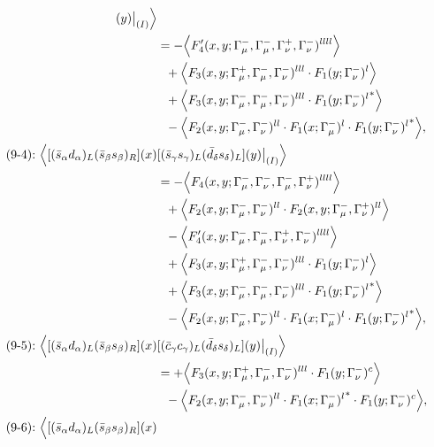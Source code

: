 \begin{align}
[(\bar d_\gamma d_\gamma)_L(\bar d_\delta s_\delta)_L](y)\big|_{(I)}
\Big\rangle
\notag\\*
&=
 - \Big\langle F_4'(x,y;\Gamma_\mu^-,\Gamma_\mu^-,\Gamma_\nu^+,\Gamma_\nu^-)^{llll}\Big\rangle
\notag\\*&\ \ 
 + \Big\langle F_3(x,y;\Gamma_\mu^+,\Gamma_\mu^-,\Gamma_\nu^-)^{lll} \cdot F_1(y;\Gamma_\nu^-)^l\Big\rangle
\notag\\*&\ \ 
 + \Big\langle F_3(x,y;\Gamma_\mu^-,\Gamma_\mu^-,\Gamma_\nu^-)^{lll} \cdot {F_1(y;\Gamma_\nu^-)^l}^*\Big\rangle
\notag\\*&\ \ 
 - \Big\langle F_2(x,y;\Gamma_\mu^-,\Gamma_\nu^-)^{ll} \cdot F_1(x;\Gamma_\mu^-)^l \cdot {F_1(y;\Gamma_\nu^-)^l}^*\Big\rangle,
\\
\mbox{(9-4):}\ 
\Big\langle
[(\bar s_\alpha d_\alpha)_L(\bar s_\beta s_\beta)_R](x)&
[(\bar s_\gamma s_\gamma)_L(\bar d_\delta s_\delta)_L](y)\big|_{(I)}
\Big\rangle
\notag\\*
&=
 - \Big\langle F_4(x,y;\Gamma_\mu^-,\Gamma_\nu^-,\Gamma_\mu^-,\Gamma_\nu^+)^{llll}\Big\rangle
\notag\\*&\ \ 
 + \Big\langle F_2(x,y;\Gamma_\mu^-,\Gamma_\nu^-)^{ll} \cdot F_2(x,y;\Gamma_\mu^-,\Gamma_\nu^+)^{ll}\Big\rangle
\notag\\*&\ \ 
 - \Big\langle F_4'(x,y;\Gamma_\mu^-,\Gamma_\mu^-,\Gamma_\nu^+,\Gamma_\nu^-)^{llll}\Big\rangle
\notag\\*&\ \ 
 + \Big\langle F_3(x,y;\Gamma_\mu^+,\Gamma_\mu^-,\Gamma_\nu^-)^{lll} \cdot F_1(y;\Gamma_\nu^-)^l\Big\rangle
\notag\\*&\ \ 
 + \Big\langle F_3(x,y;\Gamma_\mu^-,\Gamma_\mu^-,\Gamma_\nu^-)^{lll} \cdot {F_1(y;\Gamma_\nu^-)^l}^*\Big\rangle
\notag\\*&\ \ 
 - \Big\langle F_2(x,y;\Gamma_\mu^-,\Gamma_\nu^-)^{ll} \cdot F_1(x;\Gamma_\mu^-)^l \cdot {F_1(y;\Gamma_\nu^-)^l}^*\Big\rangle,
\\
\mbox{(9-5):}\ 
\Big\langle
[(\bar s_\alpha d_\alpha)_L(\bar s_\beta s_\beta)_R](x)&
[(\bar c_\gamma c_\gamma)_L(\bar d_\delta s_\delta)_L](y)\big|_{(I)}
\Big\rangle
\notag\\*
&=
 + \Big\langle F_3(x,y;\Gamma_\mu^+,\Gamma_\mu^-,\Gamma_\nu^-)^{lll} \cdot F_1(y;\Gamma_\nu^-)^c\Big\rangle
\notag\\*&\ \ 
 - \Big\langle F_2(x,y;\Gamma_\mu^-,\Gamma_\nu^-)^{ll} \cdot {F_1(x;\Gamma_\mu^-)^l}^* \cdot F_1(y;\Gamma_\nu^-)^c\Big\rangle,
\\
\mbox{(9-6):}\ 
\Big\langle
[(\bar s_\alpha d_\alpha)_L(\bar s_\beta s_\beta)_R](x)&

\end{align}
